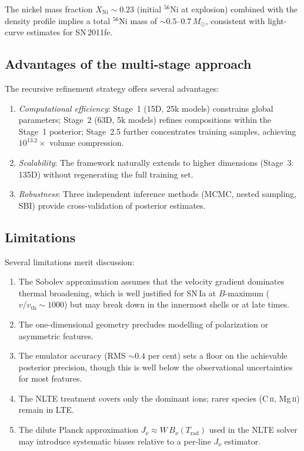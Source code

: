 \documentclass[fleqn,usenatbib]{mnras}
\begin{document}
The nickel mass fraction $X_\mathrm{Ni} \sim 0.23$ (initial $^{56}$Ni at explosion) combined with the density profile implies a total $^{56}$Ni mass of ${\sim}0.5$--$0.7\,M_\odot$, consistent with light-curve estimates for SN\,2011fe.

\subsection{Advantages of the multi-stage approach}
\label{sec:advantages}

The recursive refinement strategy offers several advantages:
\begin{enumerate}
    \item \textit{Computational efficiency}: Stage~1 (15D, 25k models) constrains global parameters; Stage~2 (63D, 5k models) refines compositions within the Stage~1 posterior; Stage~2.5 further concentrates training samples, achieving $10^{13.2}\times$ volume compression.
    \item \textit{Scalability}: The framework naturally extends to higher dimensions (Stage~3: 135D) without regenerating the full training set.
    \item \textit{Robustness}: Three independent inference methods (MCMC, nested sampling, SBI) provide cross-validation of posterior estimates.
\end{enumerate}

\subsection{Limitations}
\label{sec:limitations}

Several limitations merit discussion:
\begin{enumerate}
    \item The Sobolev approximation assumes that the velocity gradient dominates thermal broadening, which is well justified for SN\,Ia at $B$-maximum ($v/v_\mathrm{th} \sim 1000$) but may break down in the innermost shells or at late times.
    \item The one-dimensional geometry precludes modelling of polarization or asymmetric features.
    \item The emulator accuracy (RMS $\sim 0.4$ per cent) sets a floor on the achievable posterior precision, though this is well below the observational uncertainties for most features.
    \item The NLTE treatment covers only the dominant ions; rarer species (C\,\textsc{ii}, Mg\,\textsc{ii}) remain in LTE.
    \item The dilute Planck approximation $J_\nu \approx W\,B_\nu(T_\mathrm{rad})$ used in the NLTE solver may introduce systematic biases relative to a per-line $J_\nu$ estimator.
\end{enumerate}
\end{document}
